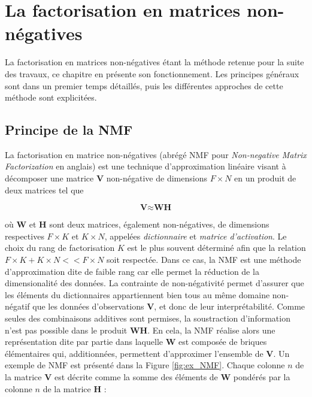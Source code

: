 %
%
%
%
%
\chapter{La factorisation en matrices non-négatives}
\label{chap:NMF}

La factorisation en matrices non-négatives étant la méthode retenue pour la suite des travaux, ce chapitre en présente son fonctionnement. Les principes généraux sont dans un premier temps détaillés, puis les différentes approches de cette méthode sont explicitées.

\section{Principe de la NMF}
La factorisation en matrice non-négatives (abrégé NMF pour \textit{Non-negative Matrix Factorization} en anglais) est une technique d'approximation linéaire visant à décomposer une matrice $\textbf{V}$ non-négative de dimensions $F \times N$ en un produit de deux matrices tel que

\begin{equation}
\textbf{V} \approx \textbf{WH}
\end{equation}

où $\textbf{W}$ et $\textbf{H}$ sont deux matrices, également non-négatives, de dimensions respectives $F \times K$ et $K \times N$, appelées \textit{dictionnaire} et \textit{matrice d'activation}. Le choix du rang de factorisation $K$ est le plus souvent déterminé afin que la relation $F \times K + K \times N << F \times N$ soit respectée. Dans ce cas, la NMF est une méthode d'approximation dite de faible rang car elle permet la réduction de la dimensionalité des données. La contrainte de non-négativité permet d'assurer que les éléments du dictionnaires appartiennent bien tous au même domaine non-négatif que les données d'observations $\mathbf{V}$, et donc de leur interprétabilité. Comme seules des combinaisons additives sont permises, la soustraction d'information n'est pas possible dans le produit $\mathbf{WH}$. En cela, la NMF réalise alors une représentation dite \og par partie \fg{} dans laquelle $\mathbf{W}$ est composée de briques élémentaires qui, additionnées, permettent d'approximer l'ensemble de $\mathbf{V}$. Un exemple de NMF est présenté dans la Figure \ref{fig:ex_NMF}. Chaque colonne $n$ de la matrice $\mathbf{V}$ est décrite comme la somme des éléments de $\mathbf{W}$ pondérés par la colonne $n$ de la matrice $\mathbf{H}$ :

